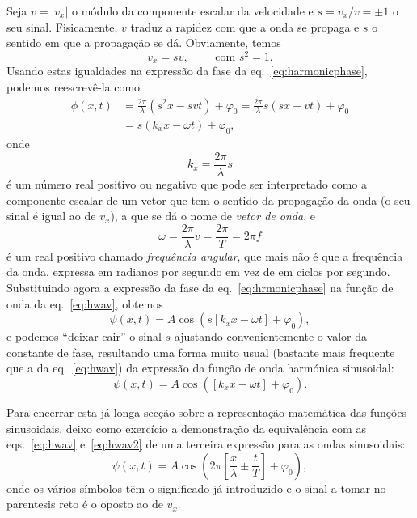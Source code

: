 Seja $v=|v_x|$ o módulo da componente escalar da velocidade e $s=v_x/v=\pm1$ o
seu sinal. Fisicamente, $v$ traduz a rapidez com que a onda se propaga e $s$ o
sentido em que a propagação se dá. Obviamente, temos
\begin{equation*}
v_x=sv,\qquad\text{ com }s^2=1.
\end{equation*}
Usando estas igualdades na expressão da fase da eq.~\eqref{eq:harmonicphase},
podemos reescrevê-la como
\begin{align}
    \phi(x,t)&=\frac{2\pi}{\lambda}(s^2x-svt)+\varphi_0=
    \frac{2\pi}{\lambda}s(sx-vt)+\varphi_0\nonumber\\
&=s(k_xx-\omega t)+\varphi_0,\label{eq:hrmonicphase}
\end{align}
onde
\begin{equation}
k_x=\frac{2\pi}{\lambda}s
\end{equation}
é um número real positivo ou negativo que pode ser interpretado como a
componente escalar de um vetor que tem o sentido da propagação da onda (o seu
sinal é igual ao de $v_x$), a que se dá o nome de \emph{vetor de onda}, e
\begin{equation}
\omega=\frac{2\pi}{\lambda}v=\frac{2\pi}{T}=2\pi f
\end{equation}
é um real positivo chamado \emph{frequência angular}, que mais não é que a
frequência da onda, expressa em radianos por segundo em vez de em ciclos por
segundo. Substituindo agora a expressão da fase da eq.~\eqref{eq:hrmonicphase}
na função de onda da eq.~\eqref{eq:hwav}, obtemos
\begin{equation*}
\psi(x,t)=A\cos(s[k_xx-\omega t] +\varphi_0),
\end{equation*}
e podemos ``deixar cair'' o sinal $s$ ajustando convenientemente
o valor da constante de fase, resultando uma forma muito usual
(bastante mais frequente que a da eq.~\eqref{eq:hwav}) da expressão da função de
onda harmónica sinusoidal:
\begin{equation}\label{eq:hwav2}
\psi(x,t)=A\cos([k_xx-\omega t] +\varphi_0).
\end{equation}

Para encerrar esta já longa secção sobre a representação matemática das funções
sinusoidais, deixo como exercício a demonstração da equivalência com as
eqs.~\eqref{eq:hwav} e~\eqref{eq:hwav2} de uma terceira expressão para as ondas
sinusoidais:
\begin{equation*}
\psi(x,t) = A\cos\left(2\pi\left[\frac{x}{\lambda}\pm\frac{t}{T}\right]+\varphi_0
\right),
\end{equation*}
onde os vários símbolos têm o significado já introduzido e o sinal a tomar no
parentesis reto é o oposto ao de $v_x$.

